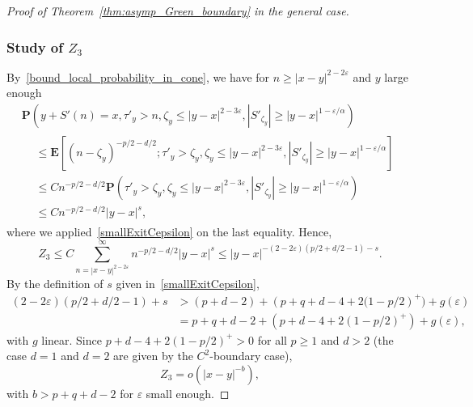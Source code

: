 \documentclass[AHL,Unicode,longabstracts,published]{cedram}
\newcommand{\pr}{\mathbf{P}}
\newcommand{\e}{\mathbf{E}}
\renewcommand{\epsilon}{\varepsilon}
\renewcommand{\leq}{\leqslant}
\renewcommand{\geq}{\geqslant}
\begin{document}
\begin{proof}[Proof of Theorem~\ref{thm:asymp_Green_boundary} in the general case]
\subsubsection*{Study of \texorpdfstring{$Z_3$}{Z3}} 
By~\eqref{bound_local_probability_in_cone}, we have for $n\geq | x-y|^{2-2\epsilon}$ and $y$ large enough
\begin{multline*}
\pr\left(y+S'(n)=x,\tau'_{y}>n,\zeta_{y}\leq | y-x|^{2-3\epsilon},\left|S'_{\zeta_{y}}\right| \geq | y-x|^{1-\epsilon/\alpha}\right)\\
\begin{aligned}
&\leq \e\left[(n-\zeta_{y})^{-p/2-d/2};\tau'_{y}>\zeta_{y},\zeta_{y}\leq |y-x|^{2-3\epsilon},\left|S'_{\zeta_{y}}\right| \geq | y-x|^{1-\epsilon/\alpha}\right]\\
&\leq Cn^{-p/2-d/2}\pr\left(\tau'_{y}>\zeta_{y},\zeta_{y}\leq |y-x|^{2-3\epsilon},\left| S'_{\zeta_{y}}\right| \geq | y-x|^{1-\epsilon/\alpha}\right)\\
&\leq Cn^{-p/2-d/2}|y-x|^{s},
\end{aligned}
\end{multline*}
where we applied~\eqref{smallExitCepsilon} on the last equality. Hence,
\[
Z_{3}\leq C\sum_{n=|x-y|^{2-2\epsilon}}^{\infty} n^{-p/2-d/2}|y-x|^{s}\leq |y-x|^{-(2-2\epsilon)(p/2+d/2-1)-s}.
\]
By the definition of $s$ given in~\eqref{smallExitCepsilon},
\begin{align*}
(2-2\epsilon)(p/2+d/2-1)+s&> (p+d-2)+\left(p+q+d-4+2(1-p/2\right)^{+})+g(\epsilon)\\
&=p+q+d-2+\left(p+d-4+2(1-p/2)^{+}\right)+g(\epsilon),
\end{align*}
with $g$ linear. Since $p+d-4+2(1-p/2)^{+}> 0$ for all $p\geq 1$ and $d> 2$ (the case $d=1$ and $d=2$ are given by the $C^2$-boundary case),
\[
Z_{3}=o\left(| x-y|^{-b}\right),
\]
with $b>p+q+d-2$ for $\epsilon$ small enough.




\end{proof}
\end{document}
